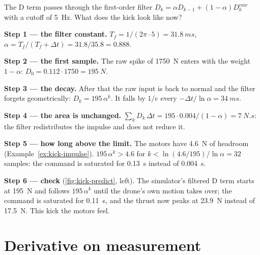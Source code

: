 \begin{example}
\label{ex:kick-filter}
The D term passes through the first-order filter $D_k = \alpha D_{k-1} + (1-\alpha)D_k^{raw}$ with a cutoff of \SI{5}{Hz}. What does the kick look like now?

\textbf{Step 1 — the filter constant.} $T_f = 1/(2\pi \cdot 5) = \SI{31.8}{ms}$, $\alpha = T_f/(T_f + \Delta t) = 31.8/35.8 = 0.888$.

\textbf{Step 2 — the first sample.} The raw spike of \SI{1750}{N} enters with the weight $1 - \alpha$: $D_0 = 0.112 \cdot 1750 = \SI{195}{N}$.

\textbf{Step 3 — the decay.} After that the raw input is back to normal and the filter forgets geometrically: $D_k = 195\,\alpha^k$. It falls by $1/e$ every $-\Delta t/\ln\alpha = \SI{34}{ms}$.

\textbf{Step 4 — the area is unchanged.} $\sum_k D_k\,\Delta t = 195 \cdot 0.004/(1 - \alpha) = \SI{7}{N.s}$: the filter redistributes the impulse and does not reduce it.

\textbf{Step 5 — how long above the limit.} The motors have \SI{4.6}{N} of headroom (Example~\ref{ex:kick-impulse}). $195\,\alpha^k > 4.6$ for $k < \ln(4.6/195)/\ln\alpha = 32$ samples: the command is saturated for \SI{0.13}{s} instead of \SI{0.004}{s}.

\textbf{Step 6 — check} (\cref{fig:kick-predict}, left). The simulator's filtered D term starts at \SI{195}{N} and follows $195\,\alpha^k$ until the drone's own motion takes over; the command is saturated for \SI{0.11}{s}, and the thrust now peaks at \SI{23.9}{N} instead of \SI{17.5}{N}. This kick the motors feel.
\end{example}


\section{Derivative on measurement}

